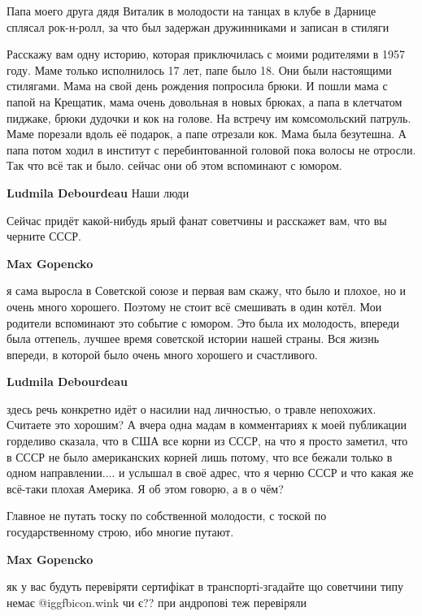 \begin{itemize}
Папа моего друга дядя Виталик в молодости на танцах в клубе в Дарнице сплясал
рок-н-ролл, за что был задержан дружинниками и записан в стиляги


Расскажу вам одну историю, которая приключилась с моими родителями в 1957 году.
Маме только исполнилось 17 лет, папе было 18. Они были настоящими стилягами.
Мама на свой день рождения попросила брюки. И пошли мама с папой на Крещатик,
мама очень довольная в новых брюках, а папа в клетчатом пиджаке, брюки дудочки
и кок на голове. На встречу им комсомольский патруль. Маме порезали вдоль её
подарок, а папе отрезали кок. Мама была безутешна. А папа потом ходил в
институт с перебинтованной головой пока волосы не отросли. Так что всё так и
было. сейчас они об этом вспоминают с юмором.

\begin{itemize} %
\textbf{Ludmila Debourdeau} Наши люди

Сейчас придёт какой-нибудь ярый фанат советчины и расскажет вам, что вы черните СССР.

\begin{itemize} %
\textbf{Max Gopencko} 

я сама выросла в Советской союзе и первая вам скажу, что было и плохое, но и
очень много хорошего. Поэтому не стоит всё смешивать в один котёл. Мои родители
вспоминают это событие с юмором. Это была их молодость, впереди была оттепель,
лучшее время советской истории нашей страны. Вся жизнь впереди, в которой было
очень много хорошего и счастливого.


\textbf{Ludmila Debourdeau} 

здесь речь конкретно идёт о насилии над личностью, о травле непохожих. Считаете
это хорошим? А вчера одна мадам в комментариях к моей публикации горделиво
сказала, что в США все корни из СССР, на что я просто заметил, что в СССР не
было американских корней лишь потому, что все бежали только в одном
направлении.... и услышал в своё адрес, что я черню СССР и что какая же
всё-таки плохая Америка. Я об этом говорю, а в о чём?

Главное не путать тоску по собственной молодости, с тоской по государственному
строю, ибо многие путают.

\textbf{Max Gopencko} 

як у вас будуть перевіряти сертифікат в транспорті-згадайте що советчини типу
немає @igg{fbicon.wink}  чи є?? при андропові теж перевіряли



\end{itemize}
\end{itemize}
\end{itemize}
